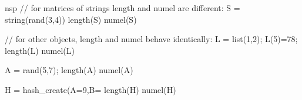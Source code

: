 \begin{examples}
\begin{mintednsp}{nsp}
// for matrices of strings length and numel are different:
S = string(rand(3,4))
length(S)
numel(S)

// for other objects, length and numel behave identically:
L = list(1,2); L(5)=78;
length(L)
numel(L)

A = rand(5,7);
length(A)
numel(A)

H = hash_create(A=9,B=%
length(H)
numel(H)
\end{mintednsp}
\end{examples}

\begin{manseealso}
\end{manseealso}
